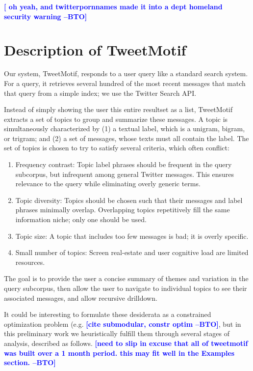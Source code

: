 \documentclass[letterpaper]{article}
\newcommand{\bto}[1]{\textcolor{blue}{\textbf{[#1 --BTO]}}}
\begin{document}
\bto { oh yeah, and twitterpornnames made it into a dept homeland security warning }


\section{Description of TweetMotif}

Our system, TweetMotif, responds to a user query like a standard search system.  For a query, it retrieves several hundred of the most recent messages that match that query from a simple index; we use the Twitter Search API.

Instead of simply showing the user this entire resultset as a list, TweetMotif extracts a set of topics to group and summarize these messages.  A topic is simultaneously characterized by (1) a textual label, which is a unigram, bigram, or trigram; and (2) a set of messages, whose texts must all contain the label.  The set of topics is chosen to try to satisfy several criteria, which often conflict:

\begin{enumerate}
\item Frequency contrast: Topic label phrases should be frequent in the query subcorpus, but infrequent among general Twitter messages.  This ensures relevance to the query while eliminating overly generic terms.
\item Topic diversity: Topics should be chosen such that their messages and label phrases minimally overlap.  Overlapping topics repetitively fill the same information niche; only one should be used.
\item Topic size: A topic that includes too few messages is bad; it is overly specific.
\item Small number of topics: Screen real-estate and user cognitive load are limited resources.
\end{enumerate}

The goal is to provide the user a concise summary of themes and variation in the query subcorpus, then allow the user to navigate to individual topics to see their associated messages, and allow recursive drilldown.

It could be interesting to formulate these desiderata as a constrained optimization problem (e.g. \bto{cite submodular, constr optim}, but in this preliminary work we heuristically fulfill them through several stages of analysis, described as follows.  \bto{need to slip in excuse that all of tweetmotif was built over a 1 month period.  this may fit well in the Examples section.}
\end{document}

